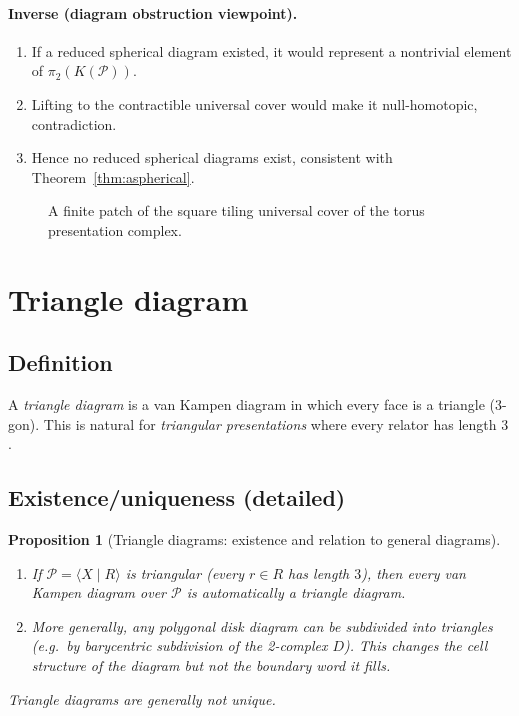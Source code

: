 \documentclass[11pt]{article}
\newtheorem{proposition}[theorem]{Proposition}
\theoremstyle{definition}
\theoremstyle{plain}
\theoremstyle{remark}
\begin{document}
\paragraph{Inverse (diagram obstruction viewpoint).}
\begin{enumerate}[leftmargin=2.2em]
\item If a reduced spherical diagram existed, it would represent a nontrivial element of $\pi_2(K(\mathcal P))$.
\item Lifting to the contractible universal cover would make it null-homotopic, contradiction.
\item Hence no reduced spherical diagrams exist, consistent with Theorem~\ref{thm:aspherical}.
\end{enumerate}

\begin{figure}[h]
\centering
{}
\caption{A finite patch of the square tiling universal cover of the torus presentation complex.}
\end{figure}

\section{Triangle diagram}

\subsection*{Definition}
A \emph{triangle diagram} is a van Kampen diagram in which every face is a triangle (3-gon).
This is natural for \emph{triangular presentations} where every relator has length $3$.

\subsection*{Existence/uniqueness (detailed)}
\begin{proposition}[Triangle diagrams: existence and relation to general diagrams]\label{prop:triangle}
\begin{enumerate}[leftmargin=2.2em]
\item If $\mathcal P=\langle X\mid R\rangle$ is triangular (every $r\in R$ has length $3$),
then every van Kampen diagram over $\mathcal P$ is automatically a triangle diagram.

\item More generally, any polygonal disk diagram can be subdivided into triangles
(e.g.\ by barycentric subdivision of the 2-complex $D$).
This changes the cell structure of the diagram but not the boundary word it fills.
\end{enumerate}
Triangle diagrams are generally not unique.
\end{proposition}
\end{document}
